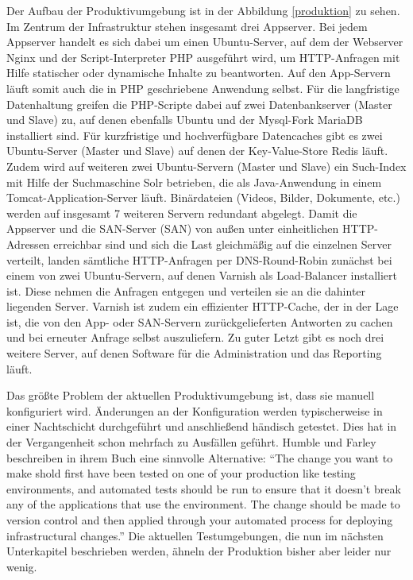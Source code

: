 Der Aufbau der Produktivumgebung ist in der Abbildung \ref{produktion} zu sehen. Im Zentrum der Infrastruktur stehen insgesamt drei Appserver. Bei jedem Appserver handelt es sich dabei um einen Ubuntu-Server, auf dem der Webserver Nginx \citep{nginx:001} und der Script-Interpreter \ac{PHP} \citep{php:001} ausgeführt wird, um HTTP-Anfragen mit Hilfe statischer oder dynamische Inhalte zu beantworten. Auf den App-Servern läuft somit auch die in \ac{PHP} geschriebene Anwendung selbst. Für die langfristige Datenhaltung greifen die PHP-Scripte dabei auf zwei Datenbankserver (Master und Slave) zu, auf denen ebenfalls Ubuntu und der Mysql-Fork MariaDB \citep{mariadb:001} installiert sind. Für kurzfristige und hochverfügbare Datencaches gibt es zwei Ubuntu-Server (Master und Slave) auf denen der Key-Value-Store Redis \citep{redis:001} läuft. Zudem wird auf weiteren zwei Ubuntu-Servern (Master und Slave) ein Such-Index mit Hilfe der Suchmaschine Solr \citep{solr:001} betrieben, die als Java-Anwendung in einem Tomcat-Application-Server \citep{tomcat:001} läuft. Binärdateien (Videos, Bilder, Dokumente, etc.) werden auf insgesamt 7 weiteren Servern redundant abgelegt. Damit die Appserver und die SAN-Server (\acl{SAN}) von außen unter einheitlichen HTTP-Adressen erreichbar sind und sich die Last gleichmäßig auf die einzelnen Server verteilt, landen sämtliche HTTP-Anfragen per DNS-Round-Robin zunächst bei einem von zwei Ubuntu-Servern, auf denen Varnish \citep{varnish:001} als Load-Balancer installiert ist. Diese nehmen die Anfragen entgegen und verteilen sie an die dahinter liegenden Server. Varnish ist zudem ein effizienter HTTP-Cache, der in der Lage ist, die von den App- oder SAN-Servern zurückgelieferten Antworten zu cachen und bei erneuter Anfrage selbst auszuliefern. Zu guter Letzt gibt es noch drei weitere Server, auf denen Software für die Administration und das Reporting läuft.

Das größte Problem der aktuellen Produktivumgebung ist, dass sie manuell konfiguriert wird. Änderungen an der Konfiguration werden typischerweise in einer Nachtschicht durchgeführt und anschließend händisch getestet. Dies hat in der Vergangenheit schon mehrfach zu Ausfällen geführt. Humble und Farley beschreiben in ihrem Buch eine sinnvolle Alternative: "`The change you want to make shold first have been tested on one of your production like testing environments, and automated tests should be run to ensure that it doesn't break any of the applications that use the environment. The change should be made to version control and then applied through your automated process for deploying infrastructural changes."' \citep[S.][S. 287]{HumFar10} Die aktuellen Testumgebungen, die nun im nächsten Unterkapitel beschrieben werden, ähneln der Produktion bisher aber leider nur wenig.

